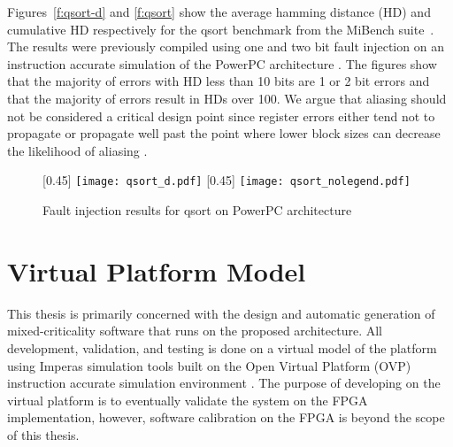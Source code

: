	Figures~\ref{f:qsort-d} and \ref{f:qsort} show the average hamming distance (HD) and cumulative HD respectively for the qsort benchmark from the MiBench suite~\cite{guthaus2001mibench}. 
	The results were previously compiled using one and two bit fault injection on an instruction accurate simulation of the PowerPC architecture \cite{georgi}. 
	The figures show that the majority of errors with HD less than 10 bits are 1 or 2 bit errors and that the majority of errors result in HDs over 100. 
	We argue that aliasing should not be considered a critical design point since register errors either tend not to propagate or propagate well past the point where lower block sizes can decrease the likelihood of aliasing \cite{Maxino:09}.
	
	
	
\begin{figure}
\centering
{}[0.45\textwidth]
{	
    \texttt{[image: qsort\_d.pdf]}
}%
\hfill
{}[0.45\textwidth]
{
    \texttt{[image: qsort\_nolegend.pdf]}
}%
\caption{Fault injection results for qsort on PowerPC architecture}
\label{f:ft-arch}
\end{figure}

\section{Virtual Platform Model}
\label{s:ovp}
	This thesis is primarily concerned with the design and automatic generation of mixed-criticality software that runs on the proposed architecture. 
	All development, validation, and testing is done on a virtual model of the platform using Imperas simulation tools \cite{imperas} built on the Open Virtual Platform (OVP) instruction accurate simulation environment \cite{ovp}. 
	The purpose of developing on the virtual platform is to eventually validate the system on the FPGA implementation, however, software
	calibration on the FPGA is beyond the scope of this thesis.

